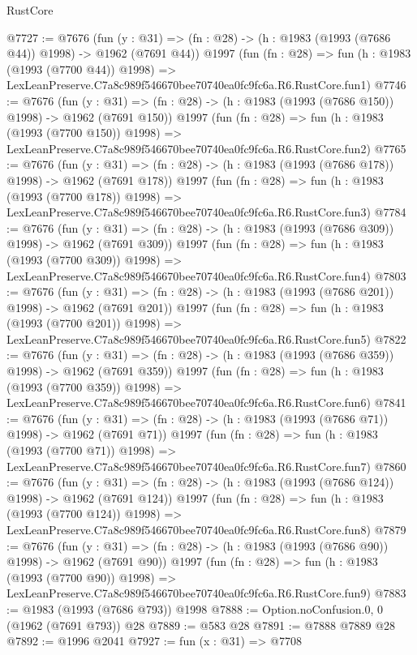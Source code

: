 \begin{lexlean}{RustCore}
\begin{coremodule}
@7727 := @7676
    (fun (y : @31) => (fn : @28) -> (h : @1983 (@1993 (@7686 @44)) @1998) -> @1962 (@7691 @44))
    @1997
    (fun (fn : @28) =>
    fun (h : @1983 (@1993 (@7700 @44)) @1998) =>
    LexLeanPreserve.C7a8c989f546670bee70740ea0fc9fc6a.R6.RustCore.fun1)
@7746 := @7676
    (fun (y : @31) => (fn : @28) -> (h : @1983 (@1993 (@7686 @150)) @1998) -> @1962 (@7691 @150))
    @1997
    (fun (fn : @28) =>
    fun (h : @1983 (@1993 (@7700 @150)) @1998) =>
    LexLeanPreserve.C7a8c989f546670bee70740ea0fc9fc6a.R6.RustCore.fun2)
@7765 := @7676
    (fun (y : @31) => (fn : @28) -> (h : @1983 (@1993 (@7686 @178)) @1998) -> @1962 (@7691 @178))
    @1997
    (fun (fn : @28) =>
    fun (h : @1983 (@1993 (@7700 @178)) @1998) =>
    LexLeanPreserve.C7a8c989f546670bee70740ea0fc9fc6a.R6.RustCore.fun3)
@7784 := @7676
    (fun (y : @31) => (fn : @28) -> (h : @1983 (@1993 (@7686 @309)) @1998) -> @1962 (@7691 @309))
    @1997
    (fun (fn : @28) =>
    fun (h : @1983 (@1993 (@7700 @309)) @1998) =>
    LexLeanPreserve.C7a8c989f546670bee70740ea0fc9fc6a.R6.RustCore.fun4)
@7803 := @7676
    (fun (y : @31) => (fn : @28) -> (h : @1983 (@1993 (@7686 @201)) @1998) -> @1962 (@7691 @201))
    @1997
    (fun (fn : @28) =>
    fun (h : @1983 (@1993 (@7700 @201)) @1998) =>
    LexLeanPreserve.C7a8c989f546670bee70740ea0fc9fc6a.R6.RustCore.fun5)
@7822 := @7676
    (fun (y : @31) => (fn : @28) -> (h : @1983 (@1993 (@7686 @359)) @1998) -> @1962 (@7691 @359))
    @1997
    (fun (fn : @28) =>
    fun (h : @1983 (@1993 (@7700 @359)) @1998) =>
    LexLeanPreserve.C7a8c989f546670bee70740ea0fc9fc6a.R6.RustCore.fun6)
@7841 := @7676
    (fun (y : @31) => (fn : @28) -> (h : @1983 (@1993 (@7686 @71)) @1998) -> @1962 (@7691 @71))
    @1997
    (fun (fn : @28) =>
    fun (h : @1983 (@1993 (@7700 @71)) @1998) =>
    LexLeanPreserve.C7a8c989f546670bee70740ea0fc9fc6a.R6.RustCore.fun7)
@7860 := @7676
    (fun (y : @31) => (fn : @28) -> (h : @1983 (@1993 (@7686 @124)) @1998) -> @1962 (@7691 @124))
    @1997
    (fun (fn : @28) =>
    fun (h : @1983 (@1993 (@7700 @124)) @1998) =>
    LexLeanPreserve.C7a8c989f546670bee70740ea0fc9fc6a.R6.RustCore.fun8)
@7879 := @7676
    (fun (y : @31) => (fn : @28) -> (h : @1983 (@1993 (@7686 @90)) @1998) -> @1962 (@7691 @90))
    @1997
    (fun (fn : @28) =>
    fun (h : @1983 (@1993 (@7700 @90)) @1998) =>
    LexLeanPreserve.C7a8c989f546670bee70740ea0fc9fc6a.R6.RustCore.fun9)
@7883 := @1983 (@1993 (@7686 @793)) @1998
@7888 := Option.noConfusion.{0, 0} (@1962 (@7691 @793)) @28
@7889 := @583 @28
@7891 := @7888 @7889 @28
@7892 := @1996 @2041
@7927 := fun (x : @31) =>
  @7708

\end{coremodule}
\end{lexlean}

